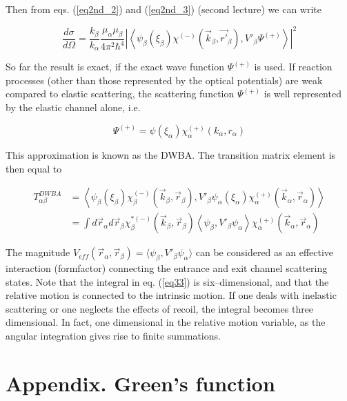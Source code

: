 Then from eqs. (\ref{eq2nd_2}) and (\ref{eq2nd_3}) (second lecture) we can write


\begin{equation}\label{eq31}
\frac{d\sigma}{d\Omega}= \frac{k_\beta}{k_\alpha} \frac{\mu_\alpha \mu_\beta}{4 \pi^2 \hbar^4} \left|
\left\langle
\psi_\beta (\xi_\beta)\chi^{(-)}(\vec k_\beta, \vec {r'}_\beta),V'_\beta \Psi^{(+)}\right\rangle \right|^2
\end{equation}



So far the result is exact, if the exact wave function $\Psi^{(+)}$ is used. If reaction processes (other than those represented by the optical potentials) are weak compared to elastic scattering, the scattering function $\Psi^{(+)}$ is well represented by the elastic channel alone, i.e.

 \begin{equation}\label{eq32}
\Psi^{(+)}=\psi(\xi_\alpha) \chi_\alpha^{(+)} (k_\alpha, r_\alpha)
\end{equation}

This approximation is known as the DWBA. The transition matrix element is then equal to

\begin{equation}\label{eq33}
\begin{split}
T_{\alpha \beta}^{DWBA}&=\left\langle
\psi_\beta (\xi_\beta)\chi_\beta^{(-)}(\vec k_\beta, \vec r_\beta),V'_\beta \psi_\alpha(\xi_\alpha) \chi_\alpha^{(+)} (\vec k_\alpha,\vec r_\alpha)\right\rangle \\
& =\int d \vec r_\alpha d \vec r_\beta  \chi_\beta^{*(-)}(\vec k_\beta, \vec r_\beta)
\left\langle \psi_\beta ,V'_\beta \psi_\alpha \right\rangle \chi_\alpha^{(+)} (\vec k_\alpha,\vec r_\alpha)
\end{split}
\end{equation}

The magnitude $V_{eff}(\vec r_\alpha, \vec r_\beta)=\langle \psi_\beta,V'_\beta \psi_\alpha \rangle$ can be considered as an effective interaction (formfactor) connecting the entrance and exit channel scattering states.
Note that the integral in eq. (\ref{eq33}) is six--dimensional, and that the relative motion is connected to the intrinsic motion. If one deals with inelastic scattering or one neglects the effects of recoil, the integral becomes three dimensional. In fact, one dimensional in the relative motion variable, as the angular integration gives rise to finite summations.
\section{Appendix. Green's function}


